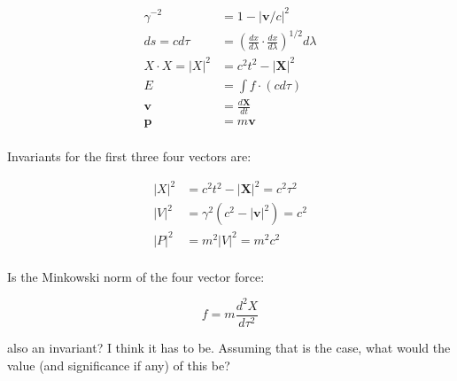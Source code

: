 \documentclass{article}      %
\begin{document}
\begin{align*}
\gamma^{-2} &= 1 - {\lvert \mathbf{v}/c \rvert}^2 \\
ds = c d\tau &= {\left(\frac{dx}{d\lambda} \cdot \frac{dx}{d\lambda}\right)}^{1/2} d\lambda \\
X \cdot X = {\lvert X \rvert}^2 &= c^2t^2 - {\lvert \mathbf{X} \rvert}^2 \\
E &= \int f \cdot (c d\tau) \\
\mathbf{v} &= \frac{d\mathbf{X}}{dt} \\
\mathbf{p} &= m\mathbf{v} \\
\end{align*}

Invariants for the first three four vectors are:

\begin{align*}
{\lvert X \rvert}^2 &= c^2 t^2 - {\lvert \mathbf{X} \rvert}^2 = c^2 \tau^2 \\
{\lvert V \rvert}^2 &= \gamma^2 (c^2 - {\lvert \mathbf{v} \rvert}^2) = c^2 \\
{\lvert P \rvert}^2 &= m^2 {\lvert V \rvert}^2 = m^2 c^2 \\
\end{align*}

Is the Minkowski norm of the four vector force:

\[
f = m\frac{d^2 X}{d\tau^2} 
\]

also an invariant?  I think it has to be.  Assuming that is the case, what would the value (and significance if any) of this be?
\end{document}
